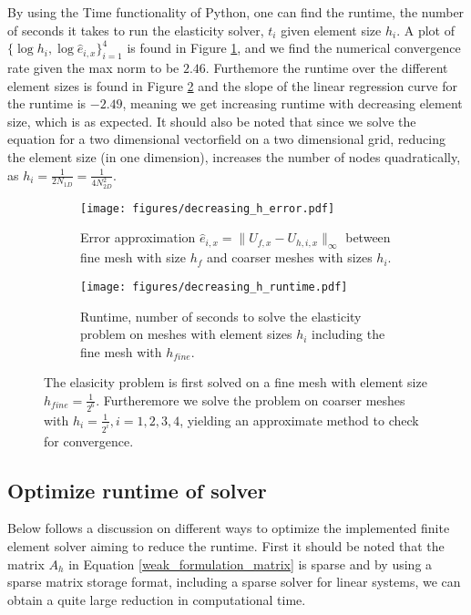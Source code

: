 \documentclass[5pt,a4paper,english]{elsarticle}%
\begin{document}
By using the Time functionality of Python, one can find the runtime, the number of seconds it takes to run the elasticity solver, $t_i$ given element size $h_i$. A plot of $\{\log h_i,\log \hat e_{i,x}\}_{i=1}^4$ is found in Figure \ref{error-convergence-elastic}, and we find the numerical convergence rate given the max norm to be $2.46$. Furthemore the runtime over the different element sizes is found in Figure \ref{time-convergence-elastic} and the slope of the linear regression curve for the runtime is $-2.49$, meaning we get increasing runtime with decreasing element size, which is as expected. It should also be noted that since we solve the equation for a two dimensional vectorfield on a two dimensional grid, reducing the element size (in one dimension), increases the number of nodes quadratically, as $h_i = \frac{1}{2N_{1D}} = \frac{1}{4N_{2D}^2}$.

\begin{figure}[t]
    \begin{subfigure}[t]{0.5\linewidth}
            \centering
                \texttt{[image: figures/decreasing\_h\_error.pdf]}
            \caption{Error approximation $\hat e_{i,x} = \|U_{f,x} - U_{h,i,x}\|_{\infty}$ between fine mesh with size $h_f$ and coarser meshes with sizes $h_i$.}
            \label{error-convergence-elastic}
        \end{subfigure}\qquad
        \begin{subfigure}[t]{0.5\linewidth}
            \centering
                \texttt{[image: figures/decreasing\_h\_runtime.pdf]}
            \caption{Runtime, number of seconds to solve the elasticity problem on meshes with element sizes $h_i$ including the fine mesh with $h_{fine}.$}
            \label{time-convergence-elastic}
        \end{subfigure}
        \label{fig-convergence-elastic}
        \caption{The elasicity problem is first solved on a fine mesh with element size $h_{fine} = \frac{1}{2^6}$. Furtheremore we solve the problem on coarser meshes with $h_i = \frac{1}{2^i}, i = 1,2,3,4$, yielding an approximate method to check for convergence.}
    \end{figure}


\subsection*{Optimize runtime of solver}

Below follows a discussion on different ways to optimize the implemented finite element solver aiming to reduce the runtime. First it should be noted that the matrix $A_h$ in Equation \ref{weak_formulation_matrix} is sparse and by using a sparse matrix storage format, including a sparse solver for linear systems, we can obtain a quite large reduction in computational time.
\end{document}
